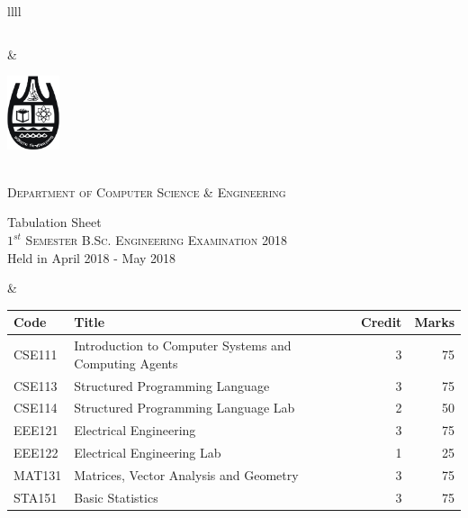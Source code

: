\documentclass[11pt]{article}
\begin{document}
\begin{table}[ht]
\begin{tabularx}{\linewidth}{llll}
\begin{minipage}[m]{0.3\linewidth}
\begin{small}
{\begin{tabular}{ |c|}
			\end{tabular}
		}
	\end{small}
\end{minipage}

&
     \hspace{-5in}
\begin{minipage}[m]{0.35\textwidth} \centering
\includegraphics[width=0.6in]{cu-logo.jpg}
	
	\smallskip
	
	\\
	\textsc{Department of Computer Science \& Engineering}\\
	
	\smallskip
	
	{\large {\sc Tabulation Sheet}}\\
	
	\smallskip
	\textsc{$1^{st}$ Semester B.Sc. Engineering Examination 2018}\\
	{Held in April 2018 - May 2018}\\
\end{minipage}
&
\hspace{1cm}
\begin{minipage}[m]{0.3\linewidth} \flushright
	\hspace{-5cm}
	\begin{small}
		\renewcommand{\arraystretch}{1.01}
		\begin{tabular} {|l|l|r|r|}
			\hline \hline Code & Title  & Credit &  Marks \\ \hline
\hline  CSE111 & Introduction to Computer Systems and Computing Agents & 3 & 75  \\
\hline  CSE113 & Structured Programming Language & 3 & 75  \\
\hline  CSE114 & Structured Programming Language Lab & 2 & 50  \\
\hline  EEE121 & Electrical Engineering & 3 & 75  \\
\hline  EEE122 & Electrical Engineering Lab & 1 & 25  \\
\hline  MAT131 & Matrices, Vector Analysis and Geometry & 3 & 75  \\
\hline  STA151 & Basic Statistics & 3 & 75  \\
 \hline
		\end{tabular}
	\end{small} 
\end{minipage}

\end{tabularx}
\end{table}
\end{document}
